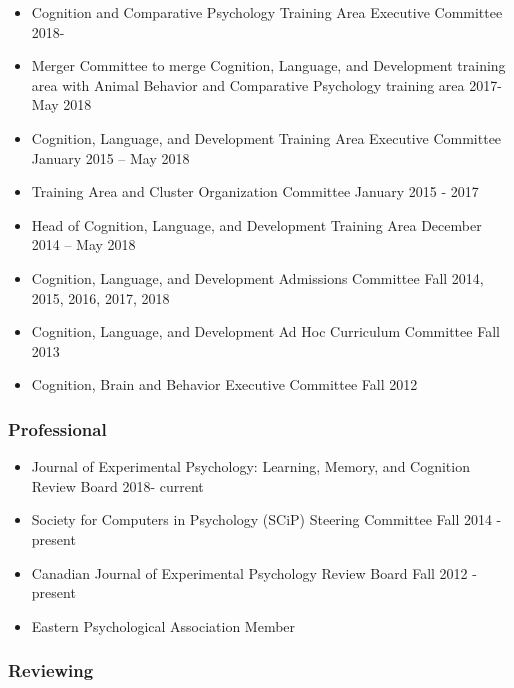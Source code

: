 \documentclass[11pt,a4paper,]{moderncv}
\providecommand{\tightlist}{%
	\setlength{\itemsep}{0pt}\setlength{\parskip}{0pt}}
\begin{document}
\begin{itemize}
\tightlist
\item
  Cognition and Comparative Psychology Training Area Executive Committee 2018-
\item
  Merger Committee to merge Cognition, Language, and Development training area with Animal Behavior and Comparative Psychology training area 2017-May 2018
\item
  Cognition, Language, and Development Training Area Executive Committee January 2015 -- May 2018
\item
  Training Area and Cluster Organization Committee January 2015 - 2017
\item
  Head of Cognition, Language, and Development Training Area December 2014 -- May 2018
\item
  Cognition, Language, and Development Admissions Committee Fall 2014, 2015, 2016, 2017, 2018
\item
  Cognition, Language, and Development Ad Hoc Curriculum Committee Fall 2013
\item
  Cognition, Brain and Behavior Executive Committee Fall 2012
\end{itemize}

\hypertarget{professional}{%
\subsubsection{Professional}\label{professional}}

\begin{itemize}
\tightlist
\item
  Journal of Experimental Psychology: Learning, Memory, and Cognition Review Board 2018- current
\item
  Society for Computers in Psychology (SCiP) Steering Committee Fall 2014 - present
\item
  Canadian Journal of Experimental Psychology Review Board Fall 2012 - present
\item
  Eastern Psychological Association Member
\end{itemize}

\hypertarget{reviewing}{%
\subsubsection{Reviewing}\label{reviewing}}
\end{document}
